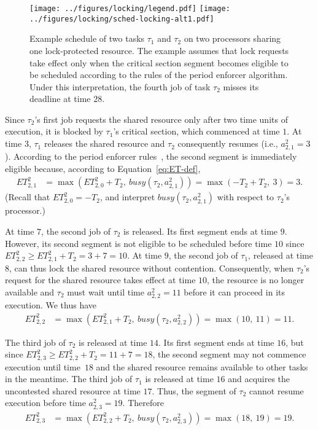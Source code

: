 \ifpaper
\begin{figure}[t]
  \centering
  \texttt{[image: ../figures/locking/legend.pdf]}
  \texttt{[image: ../figures/locking/sched-locking-alt1.pdf]}
  \caption{Example schedule of two tasks $\tau_1$ and $\tau_2$ on two processors sharing one lock-protected resource. The example assumes that lock requests take effect only when the critical section segment  becomes eligible to be scheduled according to the rules of the period enforcer algorithm. Under this interpretation, the fourth job of task $\tau_2$ misses its deadline at time $28$.}
  \label{fig:locking-alt1}
  \end{figure}
\fi

Since $\tau_2$'s first job requests the shared resource only after two time units of execution, it is blocked by $\tau_1$'s critical section, which commenced at time $1$. At time $3$, $\tau_1$ releases the shared resource and $\tau_2$ consequently resumes (i.e., $a^2_{2,1} = 3$). According to the period enforcer rules~\cite{Raj:suspension1991}, the second segment is immediately eligible because, according to Equation~\ref{eq:ET-def},
\begin{align*}
	ET_{2,1}^2 & = \max\left(ET_{2,0}^2 + T_2,\ \mathit{busy}(\tau_2, a^2_{2,1})\right) =\max(-T_2 + T_2,\ 3) = 3.
\end{align*}
(Recall that $ET_{2,0}^2 = -T_2$, and interpret $\mathit{busy}(\tau_2, a^2_{2,1})$ with respect to $\tau_2$'s processor.)


At time $7$, the second job of $\tau_2$ is released. Its first segment ends at time $9$. However, its second segment is not eligible to be scheduled before time $10$ since $ET_{2,2}^2 \geq ET_{2,1}^2 + T_2 = 3 + 7 = 10$. At time $9$, the second job of $\tau_1$, released at time $8$, can thus lock the shared resource without contention. Consequently, when $\tau_2$'s request for the shared resource takes effect at time $10$, the resource is no longer available and $\tau_2$ must wait until time $a^2_{2,2} = 11$ before it can proceed in its execution. We thus have
\begin{align*}
	ET_{2,2}^2 & = \max\left(ET_{2,1}^2 + T_2,\ \mathit{busy}(\tau_2, a^2_{2,2})\right) =\max(10,\ 11) = 11.
\end{align*}

The third job of $\tau_2$ is released at time $14$. Its first segment ends at time $16$, but since $ET_{2,3}^2 \geq ET_{2,2}^2 + T_2 = 11 + 7 = 18$, the second segment may not commence execution until time~$18$ and the shared resource remains available to other tasks in the meantime. The third job of $\tau_1$ is released at time $16$ and acquires the uncontested shared resource at time $17$. Thus, the segment of $\tau_2$ cannot resume execution before time $a^2_{2,3} = 19$. Therefore
\begin{align*}
	ET_{2,3}^2 & = \max\left(ET_{2,2}^2 + T_2,\ \mathit{busy}(\tau_2, a^2_{2,3})\right) =\max(18,\ 19) = 19.
\end{align*}

